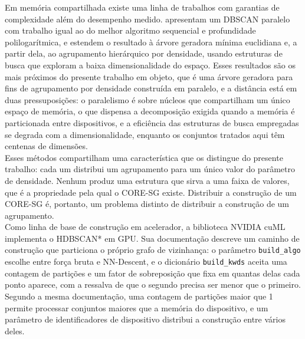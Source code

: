 Em memória compartilhada existe uma linha de trabalhos com garantias de complexidade além do desempenho medido.  apresentam um \ac{DBSCAN} paralelo com trabalho igual ao do melhor algoritmo sequencial e profundidade polilogarítmica, e  estendem o resultado à árvore geradora mínima euclidiana e, a partir dela, ao agrupamento hierárquico por densidade, usando estruturas de busca que exploram a baixa dimensionalidade do espaço. Esses resultados são os mais próximos do presente trabalho em objeto, que é uma árvore geradora para fins de agrupamento por densidade construída em paralelo, e a distância está em duas pressuposições: o paralelismo é sobre núcleos que compartilham um único espaço de memória, o que dispensa a decomposição exigida quando a memória é particionada entre dispositivos, e a eficiência das estruturas de busca empregadas se degrada com a dimensionalidade, enquanto os conjuntos tratados aqui têm centenas de dimensões.\\

Esses métodos compartilham uma característica que os distingue do presente trabalho: cada um distribui um agrupamento para um único valor do parâmetro de densidade. Nenhum produz uma estrutura que sirva a uma faixa de valores, que é a propriedade pela qual o \ac{CORE-SG} existe. Distribuir a construção de um \ac{CORE-SG} é, portanto, um problema distinto de distribuir a construção de um agrupamento.\\

Como linha de base de construção em acelerador, a biblioteca NVIDIA cuML \cite{cuml} implementa o \ac{HDBSCAN*} em \ac{GPU}. Sua documentação descreve um caminho de construção que particiona o próprio grafo de vizinhança: o parâmetro \texttt{build\_algo} escolhe entre força bruta e NN-Descent, e o dicionário \texttt{build\_kwds} aceita uma contagem de partições e um fator de sobreposição que fixa em quantas delas cada ponto aparece, com a ressalva de que o segundo precisa ser menor que o primeiro. Segundo a mesma documentação, uma contagem de partições maior que 1 permite processar conjuntos maiores que a memória do dispositivo, e um parâmetro de identificadores de dispositivo distribui a construção entre vários deles.\\


